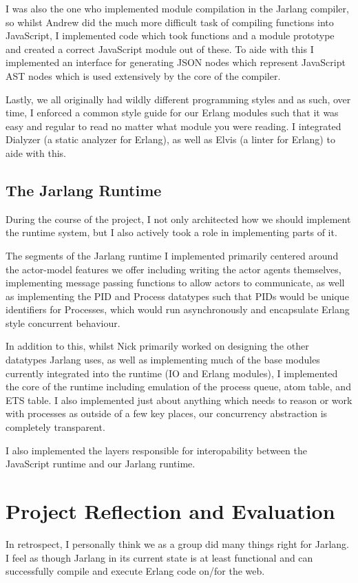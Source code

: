 \documentclass[twoside,12pt,titlepage,a4paper]{article}
\begin{document}
		I was also the one who implemented module compilation in the Jarlang compiler, so whilst Andrew did the much more difficult
		task of compiling functions into JavaScript, I implemented code which took functions and a module prototype and created
		a correct JavaScript module out of these. To aide with this I implemented an interface for generating JSON nodes which represent 
		JavaScript AST nodes which is used extensively by the core of the compiler.

		Lastly, we all originally had wildly different programming styles and as such, over time, I enforced a common style guide
		for our Erlang modules such that it was easy and regular to read no matter what module you were reading. I integrated
		Dialyzer (a static analyzer for Erlang), as well as Elvis (a linter for Erlang) to aide with this.

	\subsection{The Jarlang Runtime}
		During the course of the project, I not only architected how we should implement the runtime system, but I also actively took
		a role in implementing parts of it.

		The segments of the Jarlang runtime I implemented primarily centered around the actor-model features we offer including
		writing the actor agents themselves, implementing message passing functions to allow actors to communicate, as well as
		implementing the PID and Process datatypes such that PIDs would be unique identifiers for Processes, which would run asynchronously
		and encapsulate Erlang style concurrent behaviour.

		In addition to this, whilst Nick primarily worked on designing the other datatypes Jarlang uses, as well as implementing much of
		the base modules currently integrated into the runtime (IO and Erlang modules), I implemented the core of the runtime including
		emulation of the process queue, atom table, and ETS table. I also implemented just about anything which needs to reason or
		work with processes as outside of a few key places, our concurrency abstraction is completely transparent.

		I also implemented the layers responsible for interopability between the JavaScript runtime and our Jarlang runtime.


\section{Project Reflection and Evaluation}
\label{Project Reflection and Evaluation}
	In retrospect, I personally think we as a group did many things right for Jarlang. I feel as though Jarlang in its current state is
	at least functional and can successfully compile and execute Erlang code on/for the web.
\end{document}
